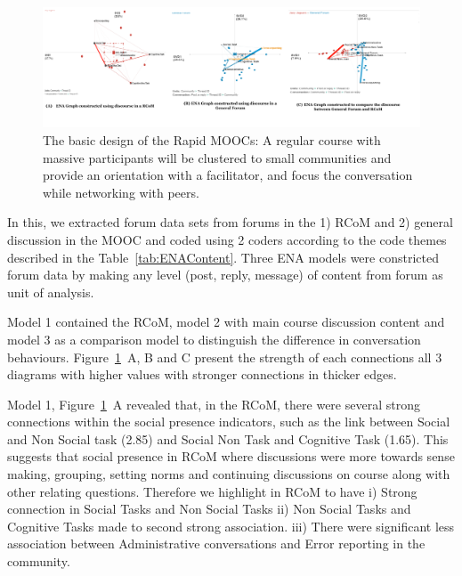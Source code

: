 \documentclass[format=acmsmall, review=false, screen=true]{acmart}
\begin{document}
\begin{figure}[h]
 \centering
 \includegraphics[width=\linewidth]{images/ENADiagrams.png}
 \caption{The basic design of the Rapid MOOCs: A regular course with massive participants will be clustered to small communities and provide an orientation with a facilitator, and focus the conversation while networking with peers.}
 \label{fig:ENADiagrams}
\end{figure}

In this, we extracted forum data sets from forums in the 1) RCoM and 2) general discussion in the MOOC and coded using 2 coders according to the code themes described in the Table~\ref{tab:ENAContent}. Three ENA models were constricted forum data by making any level (post, reply, message) of content from forum as unit of analysis.

Model 1 contained the RCoM, model 2 with main course discussion content and model 3 as a comparison model to distinguish the difference in conversation behaviours. Figure~\ref{fig:ENADiagrams}~A, B and C present the strength of each connections all 3 diagrams with higher values with stronger connections in thicker edges. 

Model 1, Figure~\ref{fig:ENADiagrams}~A revealed that, in the RCoM, there were several strong connections within the social presence indicators, such as the link between Social and Non Social task (2.85) and Social Non Task and Cognitive Task (1.65). This suggests that social presence in RCoM where discussions were more towards sense making, grouping, setting norms and continuing discussions on course along with other relating questions. Therefore we highlight in RCoM to have i) Strong connection in Social Tasks and Non Social Tasks ii) Non Social Tasks and Cognitive Tasks made to second strong association. iii) There were significant less association between Administrative conversations and Error reporting in the community. 
\end{document}
